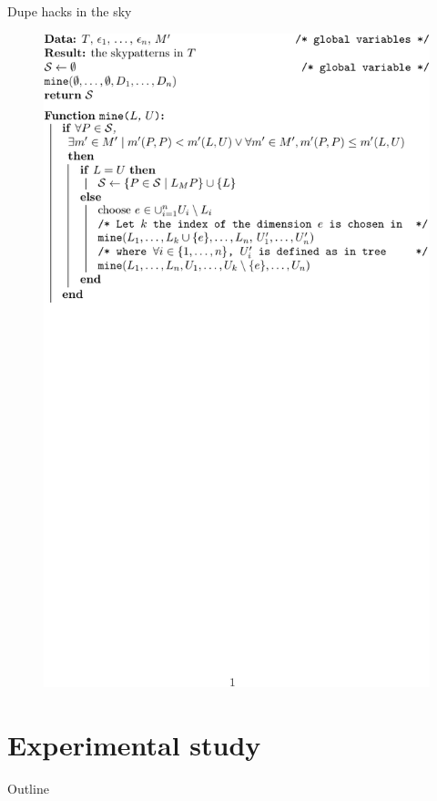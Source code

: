 \documentclass{beamer}
\begin{document}
\begin{frame}{Dupe hacks in the sky}
\vspace{0.3cm}
  \begin{figure}[htp]
  \centering
  \includegraphics[width=\textwidth]{pseudocode-sky-crop.pdf}
  \end{figure}
\end{frame}

\section{Experimental study}
\begin{frame}{Outline}
  \tableofcontents[currentsection]
\end{frame}
\end{document}
